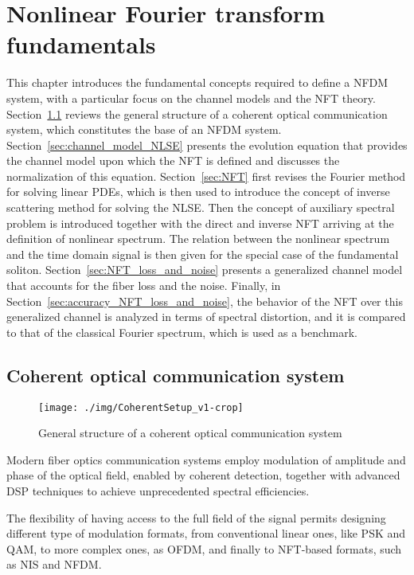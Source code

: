 \chapter{Nonlinear Fourier transform fundamentals}\label{ch:fundamentals}

This chapter introduces the fundamental concepts required to define a \ac{NFDM}
system, with a particular focus on the channel models and the \ac{NFT} theory.
Section~\ref{sec:coherent_system} reviews the general structure of a coherent
optical communication system, which constitutes the base of an \ac{NFDM} system.
Section~\ref{sec:channel_model_NLSE} presents the evolution equation that
provides the channel model upon which the \ac{NFT} is defined and discusses
the normalization of this equation. Section~\ref{sec:NFT} first revises the
Fourier method for solving linear \acp{PDE}, which is then used to introduce the
concept of inverse scattering method for solving the \ac{NLSE}. Then the concept
of auxiliary spectral problem is introduced together with the direct and
inverse \ac{NFT} arriving at the definition of nonlinear spectrum. The relation
between the nonlinear spectrum and the time domain signal is then given for the
special case of the fundamental soliton. Section~\ref{sec:NFT_loss_and_noise}
presents a generalized channel model that accounts for the fiber
loss and the noise. Finally, in  Section~\ref{sec:accuracy_NFT_loss_and_noise},
the behavior of the \ac{NFT} over this generalized channel is analyzed in terms of spectral
distortion, and it is compared to that of the classical Fourier spectrum, which is
used as a benchmark.

\section{Coherent optical communication system}\label{sec:coherent_system}

\begin{figure}[t]
  \centering
  \texttt{[image: ./img/CoherentSetup\_v1-crop]}
  \caption{General structure of a coherent optical communication system}
  \label{fig:coherent_setup}
\end{figure}

Modern fiber optics communication systems employ modulation of amplitude and phase of the optical field, enabled by coherent detection, together with advanced \ac{DSP} techniques to achieve unprecedented spectral efficiencies.

The flexibility of having access to the full field of the signal permits designing different type of modulation formats, from conventional linear ones, like \ac{PSK} and \ac{QAM}, to more complex ones, as \ac{OFDM}, and finally to \ac{NFT}-based formats, such as \ac{NIS} and \ac{NFDM}.

